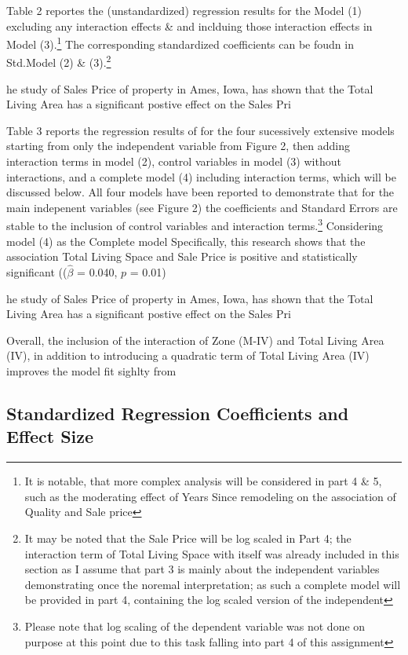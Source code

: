 \documentclass[a4paper]{article}
\begin{document}
Table 2 reportes the (unstandardized) regression results for the Model (1) excluding any interaction effects \& and inclduing those interaction effects in Model (3).\footnote{It is notable, that more complex analysis will be considered in part 4 \& 5, such as the moderating effect of Years Since remodeling on the association of Quality and Sale price} The corresponding standardized coefficients can be foudn in Std.Model (2) \& (3).\footnote{It may be noted that the Sale Price will be log scaled in Part 4; the interaction term of Total Living Space with itself was already included in this section as I assume that part 3 is mainly about the independent variables demonstrating once the noremal interpretation; as such a complete model will be provided in part 4, containing the log scaled version of the independent}





he study of Sales Price of property in Ames, Iowa, has shown that the Total Living Area has a significant postive effect on the Sales Pri


Table 3 reports the regression results of  for the four sucessively extensive models starting from only the independent variable from Figure 2, then adding interaction terms in model (2), control variables in model (3) without interactions, and a complete model (4) including interaction terms, which will be discussed below. All four models have been reported to demonstrate that for the main indepenent variables (see Figure 2) the coefficients and Standard Errors are stable to the inclusion of control variables and interaction terms.\footnote{Please note that log scaling of the dependent variable was not done on purpose at this point due to this task falling into part 4 of this assignment}
Considering model (4) as the Complete model
Specifically, this research shows that the association Total Living Space and Sale Price is positive and  statistically significant (($\hat{\beta}$ = 0.040, $p$ = 0.01)


he study of Sales Price of property in Ames, Iowa, has shown that the Total Living Area has a significant postive effect on the Sales Pri

Overall, the inclusion of the interaction of Zone (M-IV) and Total Living Area (IV), in addition to introducing a quadratic term of Total Living Area (IV) improves the model fit sighlty from 


\subsection{Standardized Regression Coefficients and Effect Size}
\end{document}
